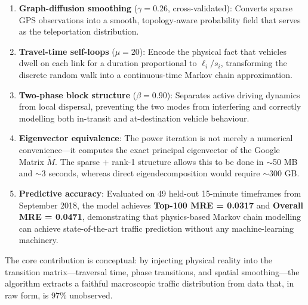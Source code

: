 \documentclass[12pt,a4paper]{article}
\theoremstyle{definition}
\theoremstyle{plain}
\begin{document}
\begin{enumerate}[label=\textbf{\arabic*.}]
  \item \textbf{Graph-diffusion smoothing} ($\gamma=0.26$, cross-validated):
    Converts sparse GPS observations into a smooth, topology-aware probability field
    that serves as the teleportation distribution.

  \item \textbf{Travel-time self-loops} ($\mu=20$): Encode the physical fact that
    vehicles dwell on each link for a duration proportional to $\ell_i/s_i$, transforming
    the discrete random walk into a continuous-time Markov chain approximation.

  \item \textbf{Two-phase block structure} ($\beta=0.90$): Separates active driving
    dynamics from local dispersal, preventing the two modes from interfering and correctly
    modelling both in-transit and at-destination vehicle behaviour.

  \item \textbf{Eigenvector equivalence}: The power iteration is not merely a numerical
    convenience---it computes the exact principal eigenvector of the Google Matrix
    $\widetilde{M}$. The sparse $+$ rank-1 structure allows this to be done in $\sim$50 MB
    and $\sim$3 seconds, whereas direct eigendecomposition would require $\sim$300 GB.

  \item \textbf{Predictive accuracy}: Evaluated on 49 held-out 15-minute timeframes
    from September 2018, the model achieves \textbf{Top-100 MRE = 0.0317} and
    \textbf{Overall MRE = 0.0471}, demonstrating that physics-based Markov chain
    modelling can achieve state-of-the-art traffic prediction without any
    machine-learning machinery.
\end{enumerate}

\begin{result}
  The core contribution is conceptual: by injecting physical reality into the
  transition matrix---traversal time, phase transitions, and spatial smoothing---the
  algorithm extracts a faithful macroscopic traffic distribution from data that, in raw
  form, is 97\% unobserved.
\end{result}
\end{document}
